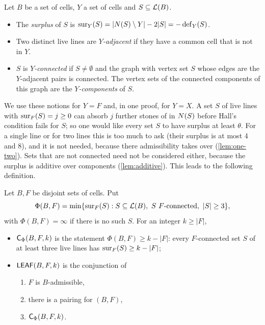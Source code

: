 \begin{definition}\label{def:surplus}
Let $B$ be a set of cells, $Y$ a set of cells and $S\subseteq\mathcal{L}(B)$.
\begin{itemize}
\item The \emph{surplus} of $S$ is $\operatorname{sur}_Y(S)=|N(S)\setminus Y|-2|S|=-\operatorname{def}_Y(S)$.
\item Two distinct live lines are \emph{$Y$-adjacent} if they have a common cell that is not in $Y$.
\item $S$ is \emph{$Y$-connected} if $S\ne\emptyset$ and the graph with vertex set $S$ whose edges are
      the $Y$-adjacent pairs is connected. The vertex sets of the connected components of this graph are
      the \emph{$Y$-components} of $S$.
\end{itemize}
\end{definition}

We use these notions for $Y=F$ and, in one proof, for $Y=X$. A set $S$ of live lines with
$\operatorname{sur}_F(S)=j\ge 0$ can absorb $j$ further stones of \Maker{} in $N(S)$ before Hall's condition
fails for $S$; so one would like every set $S$ to have surplus at least $\theta$. For a single line or
for two lines this is too much to ask (their surplus is at most $4$ and $8$), and it is not needed,
because there admissibility takes over (\cref{lem:one-two}). Sets that are not connected need not be
considered either, because the surplus is additive over components (\cref{lem:additive}). This leads to
the following definition.

\begin{definition}\label{def:leaf}
Let $B,F$ be disjoint sets of cells. Put
\[
  \Phi(B,F)=\min\{\sur_F(S) : S\subseteq\live{B},\ S\ F\text{-connected},\ |S|\ge 3\},
\]
with $\Phi(B,F)=\infty$ if there is no such $S$. For an integer $k\ge|F|$,
\begin{itemize}
\item $\mathsf{C}_\Phi(B,F,k)$ is the statement $\Phi(B,F)\ge k-|F|$: every $F$-connected set $S$ of at least three
      live lines has $\operatorname{sur}_F(S)\ge k-|F|$;
\item $\mathsf{LEAF}(B,F,k)$ is the conjunction of
  \begin{enumerate}[label=\textup{(L\arabic*)}]
  \item $F$ is $B$-admissible,
  \item there is a pairing for $(B,F)$,
  \item $\mathsf{C}_\Phi(B,F,k)$.
  \end{enumerate}
\end{itemize}
\end{definition}

